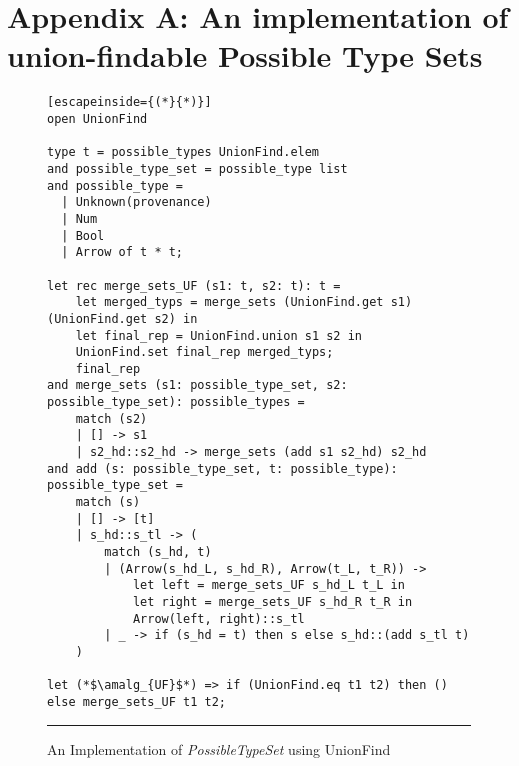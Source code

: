 \newpage
\section{Appendix A: An implementation of union-findable Possible Type Sets}

\begin{figure}[h!]
\begin{lstlisting}[escapeinside={(*}{*)}]
open UnionFind

type t = possible_types UnionFind.elem
and possible_type_set = possible_type list
and possible_type =
  | Unknown(provenance)
  | Num
  | Bool
  | Arrow of t * t;

let rec merge_sets_UF (s1: t, s2: t): t =
    let merged_typs = merge_sets (UnionFind.get s1) (UnionFind.get s2) in
    let final_rep = UnionFind.union s1 s2 in
    UnionFind.set final_rep merged_typs;
    final_rep
and merge_sets (s1: possible_type_set, s2: possible_type_set): possible_types = 
    match (s2)
    | [] -> s1
    | s2_hd::s2_hd -> merge_sets (add s1 s2_hd) s2_hd
and add (s: possible_type_set, t: possible_type): possible_type_set =
    match (s)
    | [] -> [t]
    | s_hd::s_tl -> (
        match (s_hd, t)
        | (Arrow(s_hd_L, s_hd_R), Arrow(t_L, t_R)) ->
            let left = merge_sets_UF s_hd_L t_L in
            let right = merge_sets_UF s_hd_R t_R in
            Arrow(left, right)::s_tl
        | _ -> if (s_hd = t) then s else s_hd::(add s_tl t)
    )

let (*$\amalg_{UF}$*) => if (UnionFind.eq t1 t2) then () else merge_sets_UF t1 t2;

\end{lstlisting}
\vspace{-4px}
 \hrule
\caption{An Implementation of \textit{PossibleTypeSet} using UnionFind}
\label{fig:ufalgcode}
\end{figure}